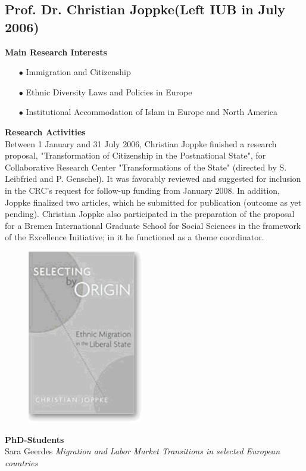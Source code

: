 \subsection[Prof. Dr. Christian Joppke] {Prof. Dr. Christian Joppke{\normalfont\normalsize\newline(Left IUB in July 2006)}}

\vspace{0.3cm}
\textbf{Main Research Interests}\\[-0.25cm]
\begin{enumerate}
\item[$\bullet$]	Immigration and Citizenship
\item[$\bullet$]	Ethnic Diversity Laws and Policies in Europe
\item[$\bullet$]	Institutional Accommodation of Islam in Europe and North America
\end{enumerate}


\vspace{0.6cm}
\textbf{Research Activities}\\[-0.25cm]

Between 1 January and 31 July 2006, Christian Joppke finished a research proposal, "Transformation of Citizenship in the Postnational State", for Collaborative Research Center "Transformations of the State" (directed by S. Leibfried and P. Genschel). It was favorably reviewed and suggested for inclusion in the CRC's request for follow-up funding from January 2008. In addition, Joppke finalized two articles, which he submitted for publication (outcome as yet pending). Christian Joppke also participated in the preparation of the proposal for a Bremen International Graduate School for Social Sciences in the framework of the Excellence Initiative; in it he functioned as a theme coordinator.
\begin{figure}[ht]
  \begin{center}
    \includegraphics[width=5cm]{./SocSci/Joppke-fig001.pdf}
   \end{center}
\end{figure}


\vspace{0.6cm}
\textbf{PhD-Students}\\[-0.25cm]

Sara Geerdes\newline
\textit{Migration and Labor Market Transitions in selected European countries}
